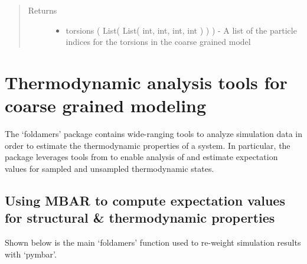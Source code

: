 \documentclass[letterpaper,12pt,english,openany,oneside]{sphinxmanual}
\begin{document}
\begin{fulllineitems}
\begin{fulllineitems}
\begin{quote}
\begin{description}
\item[{Returns}] \leavevmode
\begin{itemize}
\item {} 
torsions ( List( List( int, int, int, int ) ) ) - A list of the particle indices for the torsions in the coarse grained model

\end{itemize}


\end{description}\end{quote}

\end{fulllineitems}


\end{fulllineitems}



\chapter{Thermodynamic analysis tools for coarse grained modeling}
\label{\detokenize{thermo:thermodynamic-analysis-tools-for-coarse-grained-modeling}}\label{\detokenize{thermo::doc}}
The ‘foldamers’ package contains wide-ranging tools to analyze simulation data in order to estimate the thermodynamic properties of a system.  In particular, the package leverages tools from  to enable analysis of and estimate expectation values for sampled and unsampled thermodynamic states.


\section{Using MBAR to compute expectation values for structural \& thermodynamic properties}
\label{\detokenize{thermo:using-mbar-to-compute-expectation-values-for-structural-thermodynamic-properties}}
Shown below is the main ‘foldamers’ function used to re-weight simulation results with ‘pymbar’.

\label{\detokenize{thermo:module-parameters.reweight}}
\end{document}
